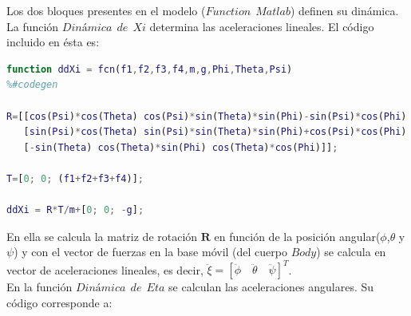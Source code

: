 \documentclass[twoside,11pt]{book}
\begin{document}
Los dos bloques presentes en el modelo ($Function \>\> Matlab$) definen su dinámica. La función $Dinámica \>\> de \>\> Xi$ determina las aceleraciones lineales. El código incluido en ésta es:\\


\begin{lstlisting}[language=Matlab]
function ddXi = fcn(f1,f2,f3,f4,m,g,Phi,Theta,Psi)
%#codegen

R=[[cos(Psi)*cos(Theta) cos(Psi)*sin(Theta)*sin(Phi)-sin(Psi)*cos(Phi) cos(Psi)*sin(Theta)*cos(Phi)+sin(Psi)*sin(Phi)];
   [sin(Psi)*cos(Theta) sin(Psi)*sin(Theta)*sin(Phi)+cos(Psi)*cos(Phi) sin(Psi)*sin(Theta)*cos(Phi)-cos(Psi)*sin(Phi)];
   [-sin(Theta) cos(Theta)*sin(Phi) cos(Theta)*cos(Phi)]];

T=[0; 0; (f1+f2+f3+f4)];

ddXi = R*T/m+[0; 0; -g];
\end{lstlisting}

En ella se calcula la matriz de rotación $\mathbf{R}$ en función de la posición angular($\phi$,$\theta$ y $\psi$) y con el vector de fuerzas en la base móvil (del cuerpo $Body$) se calcula en vector de aceleraciones lineales, es decir, $\ddot{\xi}=\left[ \ddot{\phi} \quad \ddot{\theta} \quad \ddot{\psi} \right]^{T}$. \\

En la función $Dinámica \>\> de \>\> Eta$ se calculan las aceleraciones angulares. Su código corresponde a: 
\end{document}
